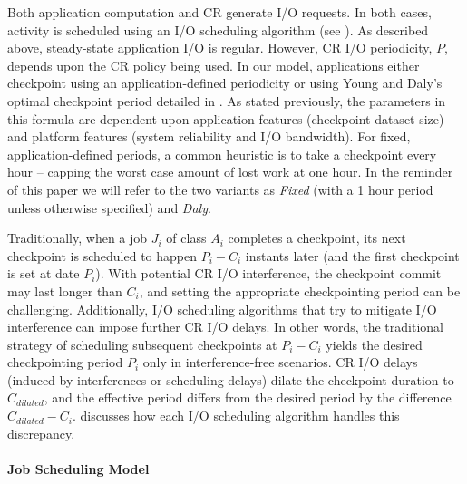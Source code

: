 \documentclass[two]{article}
\newcommand{\app}[1]{A_{#1}}
\newcommand{\period}[1]{P_{#1}}
\newcommand{\ckpt}[1]{C_{#1}}
\begin{document}
Both application computation and CR generate I/O requests.  In both cases, activity
is scheduled using an I/O scheduling algorithm (see ). As
described above, steady-state application I/O is regular. However, CR I/O
periodicity, $P$, depends upon the CR policy being used.  In our model, applications
either checkpoint using an application-defined periodicity or using Young and
Daly's~\cite{young74,daly04} optimal checkpoint period detailed in
. As stated previously, the parameters in this formula are dependent
upon application features (checkpoint dataset size) and platform features (system
reliability and I/O bandwidth).  For fixed, application-defined periods, a common
heuristic is to take a checkpoint every hour -- capping the worst case amount of lost
work at one hour.  In the reminder of this paper we will refer to the two variants as
\emph{Fixed} (with a 1 hour period unless otherwise specified) and \emph{Daly}.




Traditionally, when a job $J_{i}$ of class $\app{i}$ completes a checkpoint, its next
checkpoint is scheduled to happen $\period{i}-\ckpt{i}$ instants later (and the first
checkpoint is set at date $\period{i}$). With potential CR I/O interference,
the checkpoint commit may last longer than $\ckpt{i}$, and setting
the appropriate checkpointing period can be challenging.
Additionally, I/O scheduling algorithms that try to mitigate I/O interference can
impose further CR I/O delays.  In other words, the traditional strategy of scheduling
subsequent checkpoints at $\period{i}-\ckpt{i}$ yields the desired checkpointing
period $\period{i}$ only in interference-free scenarios. CR I/O delays (induced by
interferences or scheduling delays) dilate the checkpoint duration to $C_{dilated}$,
and the effective period differs from the desired period by the difference
$C_{dilated}-\ckpt{i}$.   discusses how each I/O
scheduling algorithm handles this discrepancy.

\paragraph*{Job Scheduling Model}
\end{document}
